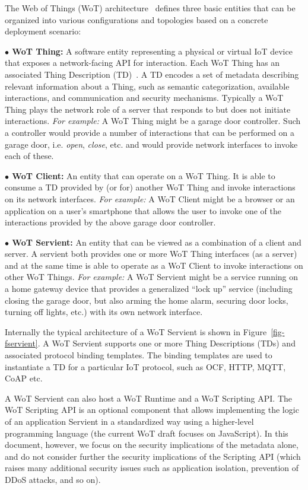 The Web of Things (WoT) architecture~\cite{Wot2017arch} defines three basic entities
that can be organized into various configurations and topologies 
based on a concrete deployment scenario:

\noindent\textbf{$\bullet$ WoT Thing:} A software entity
        representing a physical or virtual IoT device 
        that exposes a network-facing API for interaction.
	Each WoT Thing has an associated Thing Description (TD)~\cite{Wot2017td}. 
        A TD encodes a set of metadata describing relevant information about a Thing,
        such as semantic categorization, available interactions, and communication and security mechanisms.
        Typically a WoT Thing plays the network role of a server that responds to
        but does not initiate interactions.
\emph{For example:} 
A WoT Thing might be a garage door controller.
Such a controller would provide a number of interactions that can be performed on a garage door, 
i.e. \textit{open}, \textit{close}, etc. and would provide network interfaces to invoke
each of these.

\noindent\textbf{$\bullet$ WoT Client:} An entity that can operate on a WoT Thing.
It is able to consume a TD provided by (or for) another WoT Thing and invoke interactions on 
its network interfaces.
\emph{For example:} 
A WoT Client might be a browser or an application on a user's smartphone
that allows the user to invoke one of the interactions provided by the above garage door controller. 

\noindent\textbf{$\bullet$ WoT Servient:} An entity that can be viewed as a combination of a client and server.
        A servient both provides one or more WoT Thing interfaces (as a server) and
        at the same time is able to operate as a WoT Client to invoke interactions on other WoT Things.
\emph{For example:} 
A WoT Servient might be a service running on a home gateway device 
that provides a generalized ``lock up'' service (including closing the garage door, but also 
arming the home alarm, securing door locks, turning off lights, etc.) with its own network interface.

Internally the typical architecture of a WoT Servient is shown in Figure~\ref{fig-fservient}. 
A WoT Servient supports one or more Thing Descriptions (TDs)
and associated protocol binding templates.
The binding templates are used to instantiate a TD for a particular IoT protocol, 
such as OCF, HTTP, MQTT, CoAP etc.

A WoT Servient can also host a WoT Runtime and a WoT Scripting API.
The WoT Scripting API is an optional component that allows 
implementing the logic of an application Servient in a standardized way
using a higher-level programming language (the current WoT draft focuses on JavaScript). 
In this document, however, we focus on the security implications of the metadata alone,
and do not consider further the security implications of the Scripting API (which
raises many additional security issues such as application isolation,
prevention of DDoS attacks, and so on).

